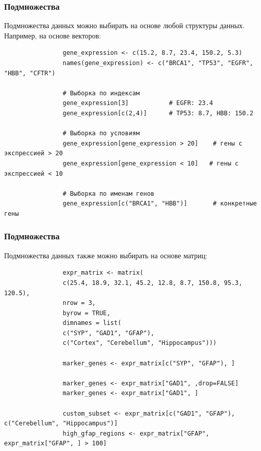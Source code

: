 \documentclass[11pt,a4paper]{beamer}
\begin{document}
	
	
	\begin{frame}[fragile]
		\frametitle{Подмножества}
		Подмножества данных можно выбирать на основе любой структуры данных. Например, на основе векторов:
		{\fontsize{8}{9}\selectfont
			
			
			\begin{verbatim}
				gene_expression <- c(15.2, 8.7, 23.4, 150.2, 5.3)
				names(gene_expression) <- c("BRCA1", "TP53", "EGFR", "HBB", "CFTR")
				
				# Выборка по индексам
				gene_expression[3]           # EGFR: 23.4
				gene_expression[c(2,4)]      # TP53: 8.7, HBB: 150.2
				
				# Выборка по условиям
				gene_expression[gene_expression > 20]    # гены с экспрессией > 20
				gene_expression[gene_expression < 10]   # гены с экспрессией < 10
				
				# Выборка по именам генов
				gene_expression[c("BRCA1", "HBB")]       # конкретные гены\end{verbatim}
			
		}
		
		
	\end{frame}
	
	\begin{frame}[fragile]
		\frametitle{Подмножества}
		Подмножества данных также можно выбирать на основе матриц:
		{\fontsize{7}{9}\selectfont
			
			\begin{verbatim}
				expr_matrix <- matrix(
				c(25.4, 18.9, 32.1, 45.2, 12.8, 8.7, 150.8, 95.3, 120.5), 
				nrow = 3,
				byrow = TRUE,
				dimnames = list(
				c("SYP", "GAD1", "GFAP"), 
				c("Cortex", "Cerebellum", "Hippocampus")))
				
				marker_genes <- expr_matrix[c("SYP", "GFAP"), ]
				
				marker_genes <- expr_matrix["GAD1", ,drop=FALSE]
				marker_genes <- expr_matrix["GAD1", ]
				
				custom_subset <- expr_matrix[c("GAD1", "GFAP"), c("Cerebellum", "Hippocampus")]
				high_gfap_regions <- expr_matrix["GFAP", expr_matrix["GFAP", ] > 100]          
				
			\end{verbatim}
		}
		
		
	\end{frame}
	
\end{document}
